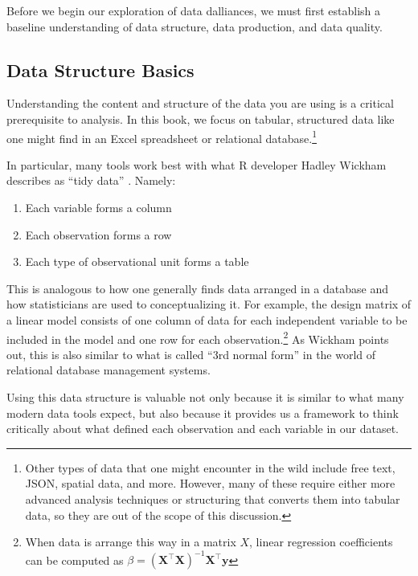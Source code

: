\documentclass[
]{krantz}
\providecommand{\tightlist}{%
  \setlength{\itemsep}{0pt}\setlength{\parskip}{0pt}}
\begin{document}
Before we begin our exploration of data dalliances, we must first establish a baseline understanding of data structure, data production, and data quality.

\hypertarget{data-structure-basics}{%
\subsection{Data Structure Basics}\label{data-structure-basics}}

Understanding the content and structure of the data you are using is a critical prerequisite to analysis.
In this book, we focus on tabular, structured data like one might find in an Excel spreadsheet or relational database.\footnote{Other types of data that one might encounter in the wild include free text, JSON, spatial data, and more. However, many of these require either more advanced analysis techniques or structuring that converts them into tabular data, so they are out of the scope of this discussion.}

In particular, many tools work best with what R developer Hadley Wickham describes as ``tidy data'' \citep{wickham_tidy}. Namely:

\begin{enumerate}
\def\labelenumi{\arabic{enumi}.}
\tightlist
\item
  Each variable forms a column
\item
  Each observation forms a row
\item
  Each type of observational unit forms a table
\end{enumerate}

This is analogous to how one generally finds data arranged in a database and how statisticians are used to conceptualizing it.
For example, the design matrix of a linear model consists of one column of data for each independent variable to be included in the model and one row for each observation.\footnote{When data is arrange this way in a matrix \(X\), linear regression coefficients can be computed as \(\beta = (\mathbf{X}^\intercal\mathbf{X})^{-1}\mathbf{X}^\intercal \mathbf{y}\)}
As Wickham points out, this is also similar to what is called ``3rd normal form'' in the world of relational database management systems.

Using this data structure is valuable not only because it is similar to what many modern data tools expect, but also because it provides us a framework to think critically about what defined each observation and each variable in our dataset.
\end{document}
